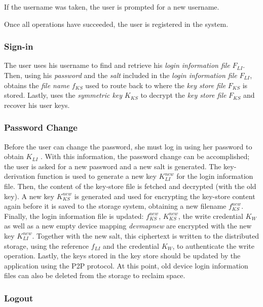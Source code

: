 If the username was taken,
the user is prompted for a new username.

Once all operations
have succeeded, the user is registered in the system.


\subsubsection{Sign-in}
The user uses his username to find and retrieve his \textit{login information
file} $F_{LI}$. Then, using his \textit{password} and the \textit{salt} included in the
\textit{login information file} $F_{LI}$, obtains the \textit{file name}
$f_{KS}$ used to
route back to where the \textit{key store file} $F_{KS}$ is stored.  Lastly, uses the
\textit{symmetric key} $K_{KS}$ to decrypt the \textit{key store file}
$F_{KS}$ and recover his user keys.

\subsubsection{Password Change}


Before the user can change the password, she must log in using her password to
obtain $K_{LI}$ . With this information, the password change can be
accomplished; the user is asked for a new password and a new salt is
generated. The key-derivation function is used to generate a new key
$K_{LI}^{new}$
for the login information file. Then, the content of the key-store file is
fetched and decrypted (with the old key). A new key $K_{KS}^{new}$ is generated and
used for encrypting the key-store content again before it is saved to the
storage system, obtaining a new filename $f_{KS}^{new}$.
Finally, the login information file
is updated: $f_{KS}^{new}$, $K_{KS}^{new}$, the write credential $K_{W}$ as well as a new empty
device mapping \textit{devmapnew} are encrypted with the new key $K_{LI}^{new}$.
  Together with the new salt, this ciphertext is written to the distributed
storage, using the reference $f_{LI}$ and the credential $K_W$, to authenticate the
write operation. Lastly, the keys stored in the key store should be updated by
the application using the P2P protocol.  At this point, old device login
information files can also be deleted from the
storage to reclaim space.

\subsubsection{Logout}

